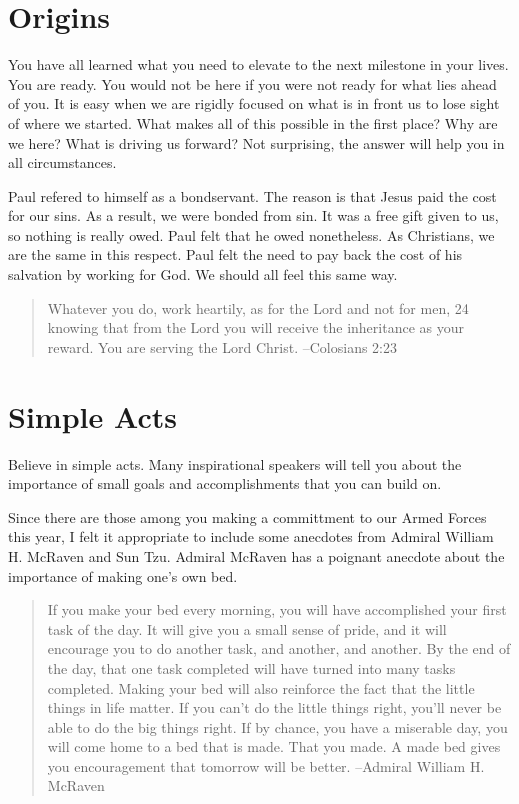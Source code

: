 \documentclass[11pt,a4paper,sans]{article}
\begin{document}
\section{Origins}

You have all learned what you need to elevate to the next milestone in your lives. You are ready. You would not be here if you were not ready for what lies ahead of you. It is easy when we are rigidly focused on what is in front us to lose sight of where we started. What makes all of this possible in the first place? Why are we here? What is driving us forward? Not surprising, the answer will help you in all circumstances.

Paul refered to himself as a bondservant. The reason is that Jesus paid the cost for our sins. As a result, we were bonded from sin. It was a free gift given to us, so nothing is really owed. Paul felt that he owed nonetheless. As Christians, we are the same in this respect. Paul felt the need to pay back the cost of his salvation by working for God. We should all feel this same way. 

\begin{quote}
    Whatever you do, work heartily, as for the Lord and not for men, 24 knowing that from the Lord you will receive the inheritance as your reward. You are serving the Lord Christ. --Colosians 2:23
\end{quote}

\section{Simple Acts}

Believe in simple acts. Many inspirational speakers will tell you about the importance of small goals and accomplishments that you can build on.

Since there are those among you making a committment to our Armed Forces this year, I felt it appropriate to include some anecdotes from Admiral William H. McRaven and Sun Tzu. Admiral McRaven has a poignant anecdote about the importance of making one's own bed. 

\begin{quote}
     If you make your bed every morning, you will have accomplished your first task of the day. It will give you a small sense of pride, and it will encourage you to do another task, and another, and another. By the end of the day, that one task completed will have turned into many tasks completed. Making your bed will also reinforce the fact that the little things in life matter. If you can't do the little things right, you'll never be able to do the big things right. If by chance, you have a miserable day, you will come home to a bed that is made. That you made. A made bed gives you encouragement that tomorrow will be better. --Admiral William H. McRaven
\end{quote}
\end{document}
